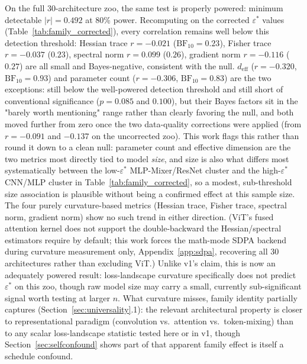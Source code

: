 \documentclass[11pt]{article}
\newcommand{\eps}{\varepsilon}
\newcommand{\epsstar}{\eps^{*}}
\begin{document}
On the full 30-architecture zoo, the same test is properly powered: minimum
detectable $|r|=0.492$ at 80\% power. Recomputing on the corrected $\epsstar$
values (Table~\ref{tab:family_corrected}), every correlation remains well
below this detection threshold: Hessian trace $r=-0.021$
($\mathrm{BF}_{10}=0.23$), Fisher trace $r=-0.037$ ($0.23$), spectral norm
$r=0.099$ ($0.26$), gradient norm $r=-0.116$ ($0.27$) are all small and
Bayes-negative, consistent with the null. $d_{\mathrm{eff}}$
($r=-0.320$, $\mathrm{BF}_{10}=0.93$) and parameter count ($r=-0.306$,
$\mathrm{BF}_{10}=0.83$) are the two exceptions: still below the
well-powered detection threshold and still short of conventional
significance ($p=0.085$ and $0.100$), but their Bayes factors sit in the
"barely worth mentioning" range rather than clearly favoring the null, and
both moved further from zero once the two data-quality corrections were
applied (from $r=-0.091$ and $-0.137$ on the uncorrected zoo). This work flags this
rather than round it down to a clean null: parameter count and effective
dimension are the two metrics most directly tied to model \emph{size}, and
size is also what differs most systematically between the low-$\epsstar$
MLP-Mixer/ResNet cluster and the high-$\epsstar$ CNN/MLP cluster in
Table~\ref{tab:family_corrected}, so a modest, sub-threshold size
association is plausible without being a confirmed effect at this sample
size. The four purely curvature-based metrics (Hessian trace, Fisher trace,
spectral norm, gradient norm) show no such trend in either direction.
(ViT's fused attention kernel does not support the double-backward the
Hessian/spectral estimators require by default; this work forces the math-mode
SDPA backend during curvature measurement only, Appendix~\ref{app:sdpa},
recovering all 30 architectures rather than excluding ViT.) Unlike v1's
claim, this is now an adequately powered result: loss-landscape curvature
specifically does not predict $\epsstar$ on this zoo, though raw model
size may carry a small, currently sub-significant signal worth testing at
larger $n$. What curvature misses, family identity partially captures
(Section~\ref{sec:universality}.1): the relevant architectural
property is closer to representational paradigm (convolution vs.\ attention
vs.\ token-mixing) than to any scalar loss-landscape statistic tested here
or in v1, though Section~\ref{sec:selfconfound} shows part of that
apparent family effect is itself a schedule confound.
\end{document}
